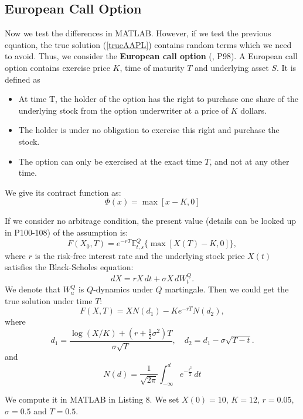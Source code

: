 \documentclass[12pt,a4paper]{article}
\theoremstyle{definition}
\begin{document}
\subsection{European Call Option}
Now we test the differences in MATLAB. However, if we test the previous equation, the true solution (\ref{trueAAPL}) contains random terms which we need to avoid. Thus, we consider the \textbf{European call option} (\cite{bjork}, P98). A European call option contains exercise price $K$, time of maturity $T$ and underlying asset $S$. It is defined as \begin{itemize}
    \item At time T, the holder of the option has the right to purchase one share of the underlying stock from the option underwriter at a price of $K$ dollars.

    \item The holder is under no obligation to exercise this right and purchase the stock. 

    \item The option can only be exercised at the exact time $T$, and not at any other time.
\end{itemize}

We give its contract function as:
\begin{equation}
    \Phi(x) = \max [x-K,0]
\end{equation}

If we consider no arbitrage condition, the present value (details can be looked up in \cite{bjork} P100-108) of the assumption is: 
\begin{equation}
    F(X_0,T) = e^{-rT}\mathbb{E}_{t,s}^Q \{\max [X(T)-K,0]\},
\end{equation}
where $r$ is the risk-free interest rate and the underlying stock price $X(t)$ satisfies the Black-Scholes equation:\begin{equation}
    dX = rX\, dt+\sigma X\, dW_t^Q.
\end{equation}
We denote that $W_u^Q$ is $Q$-dynamics under $Q$ martingale. Then we could get the true solution under time $T$:\begin{equation}
    \label{trueEuro} F(X,T)= XN(d_1)-Ke^{-rT}N(d_2) ,
\end{equation}
where $$
d_1 = \frac{\log(X/K)+(r+\frac{1}{2}\sigma^2)T}{\sigma \sqrt{T}},\quad d_2 = d_1-\sigma \sqrt{T-t}.
$$ and$$
N(d) = \frac{1}{\sqrt{2\pi}}\int_{-\infty}^d e^{-\frac{t^2}{2}}\, dt
$$

We compute it in MATLAB in Listing 8. We set $X(0)=10$, $K=12$, $r=0.05$, $\sigma = 0.5$ and $T=0.5$. 
\end{document}
